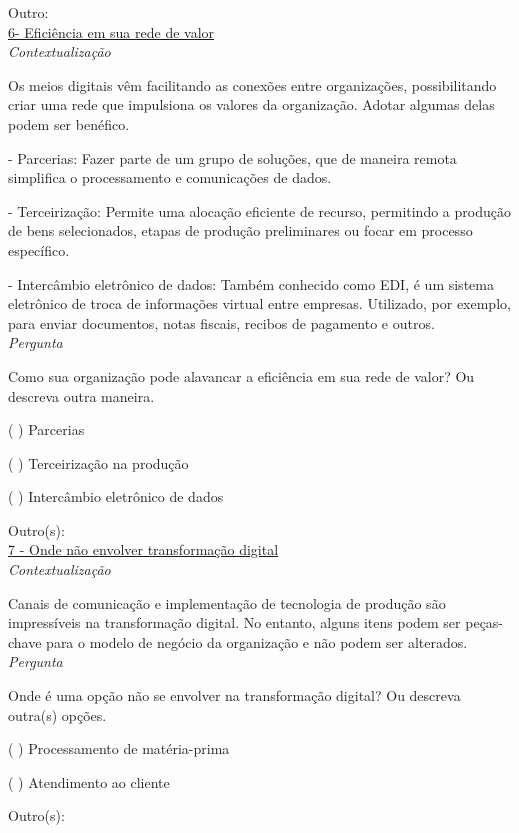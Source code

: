 Outro:\\


\underline{6- Eficiência em sua rede de valor}\\

\textit{Contextualização}

Os meios digitais vêm facilitando as conexões entre organizações, possibilitando criar uma rede que impulsiona os valores da organização. Adotar algumas delas podem ser benéfico.

- Parcerias: Fazer parte de um grupo de soluções, que de maneira remota simplifica o processamento e comunicações de dados.

- Terceirização: Permite uma alocação eficiente de recurso, permitindo a produção de bens selecionados, etapas de produção preliminares ou focar em processo específico. 

- Intercâmbio eletrônico de dados: Também conhecido como EDI, é um sistema eletrônico de troca de informações virtual entre empresas. Utilizado, por exemplo, para enviar documentos, notas fiscais, recibos de pagamento e outros.\\


\textit{Pergunta}

Como sua organização pode alavancar a eficiência em sua rede de valor? Ou descreva outra maneira.

( ) Parcerias

( ) Terceirização na produção

( ) Intercâmbio eletrônico de dados

Outro(s):\\


\underline{7 - Onde não envolver transformação digital}\\

\textit{Contextualização}

Canais de comunicação e implementação de tecnologia de produção são impressíveis na transformação digital. No entanto, alguns itens podem ser peças-chave para o modelo de negócio da organização e não podem ser alterados.\\


\textit{Pergunta}

Onde é uma opção não se envolver na transformação digital? Ou descreva outra(s) opções.

( ) Processamento de matéria-prima

( ) Atendimento ao cliente

Outro(s):\\

